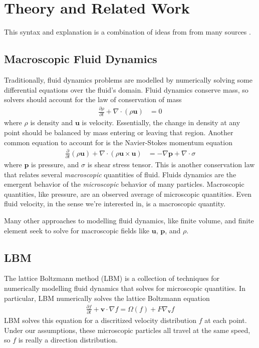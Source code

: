 \section{Theory and Related Work}\label{sec:relatedwork}

This syntax and explanation is a combination of ideas from from many sources \cite{Lyu2021,Li2020,Mei2006,Yu2005,Kruger2018}.

\subsection{Macroscopic Fluid Dynamics}

Traditionally, fluid dynamics problems are 
modelled by numerically solving some 
differential equations over the fluid's domain.
Fluid dynamics conserve mass, so solvers should account for the law of conservation of mass
\begin{align}
  \frac{\partial \rho}{\partial t} + \nabla \cdot (\rho \bm{u}) &= 0
\end{align}
where $\rho$ is density and $\bm{u}$ is velocity. 
Essentially, the change in density at any point should be 
balanced by mass entering or leaving that region.
Another common equation to account for is the Navier-Stokes momentum equation
\begin{align}
\frac{\partial}{\partial t} (\rho \bm{u}) 
+ \nabla \cdot (\rho \bm{u} \times \bm{u}) &= 
- \nabla \bm{p} + \nabla \cdot \sigma
\end{align}
where $\bm{p}$ is pressure, and $\sigma$ is shear stress tensor. 
This is another conservation law that relates several \textit{macroscopic}
quantities of fluid.
Fluids dynamics are the emergent behavior of the \textit{microscopic} 
behavior of many particles.
Macroscopic quantities, like pressure, are an observed average of 
microscopic quantities.
Even fluid velocity, in the sense we're interested in, 
is a macroscopic quantity.

Many other approaches to modelling fluid dynamics,
like finite volume, and finite element
seek to solve for macroscopic 
fields like $\bm{u}$, $\bm{p}$, and $\rho$.

\subsection{LBM}
The lattice Boltzmann method (LBM) is a collection of techniques for
numerically modelling fluid dynamics that solves for microscopic quantities.
In particular, LBM numerically solves 
the lattice Boltzmann equation
\begin{align}\label{eqn:cont_lbm}
  \frac{\partial f}{\partial t} + \bm{v} \cdot \nabla f = \Omega(f) + F\nabla_{\bm{v}} f
\end{align}
LBM solves this equation for a discritized velocity distribution $f$ at each point.
Under our assumptions, these microscopic particles all travel at the same speed, so $f$ is really a direction distribution.

